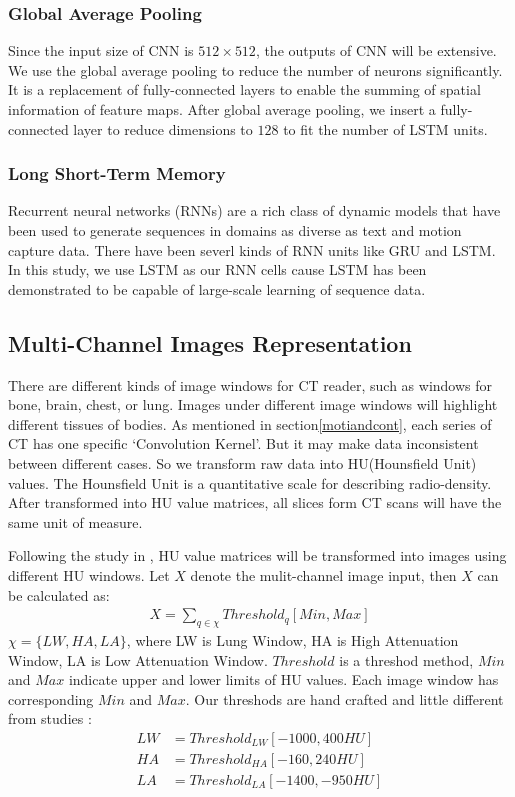 \documentclass[journal]{IEEEtran}
\begin{document}
\subsubsection{Global Average Pooling}
Since the input size of CNN is $512 \times 512$, the outputs of CNN will be extensive. We use the global average pooling \cite{lin2014network} to reduce the number of neurons significantly. It is a replacement of fully-connected layers to enable the summing of spatial information of feature maps. After global average pooling, we insert a fully-connected layer to reduce dimensions to $128$ to fit the number of LSTM units.

\subsubsection{Long Short-Term Memory}
Recurrent neural networks (RNNs) \cite{bengio1994learning} are a rich class of dynamic models that have been used to generate sequences in domains as diverse as text and motion capture data.
There have been severl kinds of RNN units like GRU \cite{cho2014learning} and LSTM.
In this study, we use LSTM as our RNN cells cause LSTM has been demonstrated to be capable of large-scale learning of sequence data. 

\subsection{Multi-Channel Images Representation}
There are different kinds of image windows for CT reader, such as windows for bone, brain, chest, or lung. Images under different image windows will highlight different tissues of bodies.
As mentioned in section\ref{motiandcont}, each series of CT has one specific `Convolution Kernel'. But it may make data inconsistent between different cases. So we transform raw data into HU(Hounsfield Unit) values. The Hounsfield Unit is a quantitative scale for describing radio-density. After transformed into HU value matrices, all slices form CT scans will have the same unit of measure.

Following the study in \cite{shin2016deep, gao2018holistic}, HU value matrices will be transformed into images using different HU windows. Let $X$ denote the mulit-channel image input, then $X$ can be calculated as:
\begin{align*}
    X=\sum_{q\in\chi}Threshold_{q}[Min, Max]
\end{align*}
$\chi=\{LW, HA, LA\}$, where LW is Lung Window, HA is High Attenuation Window, LA is Low Attenuation Window. $Threshold$ is a threshod method, $Min$ and $Max$ indicate upper and lower limits of HU values. Each image window has corresponding $Min$ and $Max$. Our threshods are hand crafted and little different from studies \cite{shin2016deep, gao2018holistic}:
\begin{align*}
    LW&=Threshold_{LW}[-1000, 400HU]\\
    HA&=Threshold_{HA}[-160, 240HU]\\
    LA&=Threshold_{LA}[-1400, -950HU]\\
\end{align*}
\end{document}
